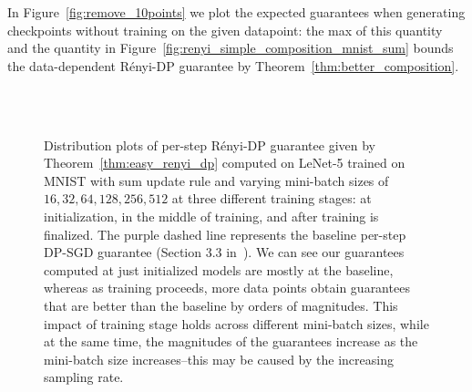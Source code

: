 In Figure~\ref{fig:remove_10points} we plot the expected guarantees when generating checkpoints without training on the given datapoint: the max of this quantity and the quantity in Figure~\ref{fig:renyi_simple_composition_mnist_sum} bounds the data-dependent R\'enyi-DP guarantee by Theorem~\ref{thm:better_composition}. 








\begin{figure}[t]
\centering
{}
\\
\\
\caption{Distribution plots of per-step R\'enyi-DP guarantee given by Theorem~\ref{thm:easy_renyi_dp} computed on LeNet-5 trained on MNIST with sum update rule and varying mini-batch sizes of $16, 32, 64, 128, 256, 512$ at three different training stages: at initialization,  in the middle of training, and after training is finalized. The purple dashed line represents the baseline per-step DP-SGD guarantee (Section 3.3 in~\citet{mironov2019r}). We can see our guarantees computed at just initialized models are mostly at the baseline, whereas as training proceeds, more data points obtain guarantees that are better than the baseline by orders of magnitudes. This impact of training stage holds across different mini-batch sizes, while at the same time, the magnitudes of the guarantees increase as the mini-batch size increases--this may be caused by the increasing sampling rate.
}
\label{fig:renyi_simple_eps_distrib_bs_mnist_sum}
\end{figure}

